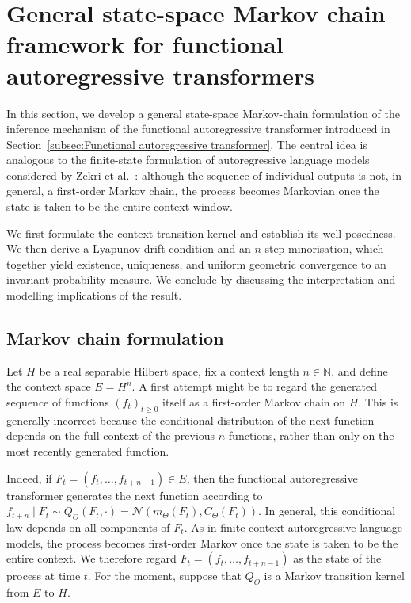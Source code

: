 \section{General state-space Markov chain framework for functional autoregressive transformers}\label{sec:General state-space Markov chain framework for functional autoregressive transformers}

In this section, we develop a general state-space Markov-chain formulation of the inference mechanism of the functional autoregressive transformer introduced in Section~\ref{subsec:Functional autoregressive transformer}. The central idea is analogous to the finite-state formulation of autoregressive language models considered by Zekri et al.~\cite{ZekriEtAl2025}: although the sequence of individual outputs is not, in general, a first-order Markov chain, the process becomes Markovian once the state is taken to be the entire context window.

We first formulate the context transition kernel and establish its well-posedness. We then derive a Lyapunov drift condition and an \(n\)-step minorisation, which together yield existence, uniqueness, and uniform geometric convergence to an invariant probability measure. We conclude by discussing the interpretation and modelling implications of the result.

\subsection{Markov chain formulation}\label{subsec:Markov chain formulation}
Let \(H\) be a real separable Hilbert space, fix a context length \(n\in\mathbb N\), and define the context space \(E=H^n\). A first attempt might be to regard the generated sequence of functions \((f_t)_{t\geqslant0}\) itself as a first-order Markov chain on \(H\). This is generally incorrect because the conditional distribution of the next function depends on the full context of the previous \(n\) functions, rather than only on the most recently generated function.

Indeed, if \(F_t=(f_t,\ldots,f_{t+n-1})\in E\), then the functional autoregressive transformer generates the next function according to \(f_{t+n}\mid F_t\sim Q_\Theta(F_t,\cdot)=\mathcal N(m_\Theta(F_t),C_\Theta(F_t))\). In general, this conditional law depends on all components of \(F_t\).
As in finite-context autoregressive language models, the process becomes first-order Markov once the state is taken to be the entire context. We therefore regard \(F_t=(f_t,\ldots,f_{t+n-1})\) as the state of the process at time \(t\). For the moment, suppose that \(Q_\Theta\) is a Markov transition kernel from \(E\) to \(H\).

